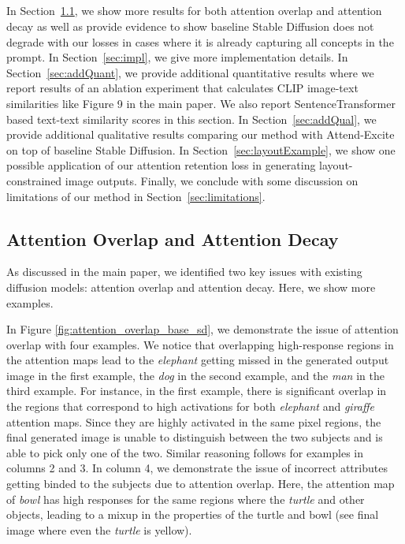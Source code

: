 \documentclass[10pt,twocolumn,letterpaper]{article}
\begin{document}
\begin{appendices}



\section{}
In Section~\ref{sec:overlapDecay}, we show more results for both attention overlap and attention decay as well as provide evidence to show baseline Stable Diffusion \cite{rombach2022high} does not degrade with our losses in cases where it is already capturing all concepts in the prompt. In Section~\ref{sec:impl}, we give more implementation details. In Section~\ref{sec:addQuant}, we provide additional quantitative results where we report results of an ablation experiment that calculates CLIP image-text similarities like Figure 9 in the main paper. We also report SentenceTransformer based text-text similarity scores in this section. In Section~\ref{sec:addQual}, we provide additional qualitative results comparing our method with Attend-Excite \cite{chefer2023attend} on top of baseline Stable Diffusion. In Section~\ref{sec:layoutExample}, we show one possible application of our attention retention loss in generating layout-constrained image outputs. Finally, we conclude with some discussion on limitations of our method in Section~\ref{sec:limitations}.

\subsection{Attention Overlap and Attention Decay}
\label{sec:overlapDecay}
As discussed in the main paper, we identified two key issues with existing diffusion models: attention overlap and attention decay. Here, we show more examples. 

In Figure \ref{fig:attention_overlap_base_sd}, we demonstrate the issue of attention overlap with four examples. We notice that overlapping high-response regions in the attention maps lead to the \textit{elephant} getting missed in the generated output image in the first example, the \textit{dog} in the second example, and the \textit{man} in the third example. For instance, in the first example, there is significant overlap in the regions that correspond to high activations for both \textit{elephant} and \textit{giraffe} attention maps. Since they are highly activated in the same pixel regions, the final generated image is unable to
distinguish between the two subjects and is able to pick only one of the two. Similar reasoning follows for examples in columns 2 and 3. In column 4, we demonstrate the issue of incorrect attributes getting binded to the subjects due to attention overlap. Here, the attention map of \textit{bowl} has high responses for the same regions where the \textit{turtle} and other objects, leading to a mixup in the properties of the turtle and bowl (see final image where even the \textit{turtle} is yellow). 


\end{appendices}
\end{document}
